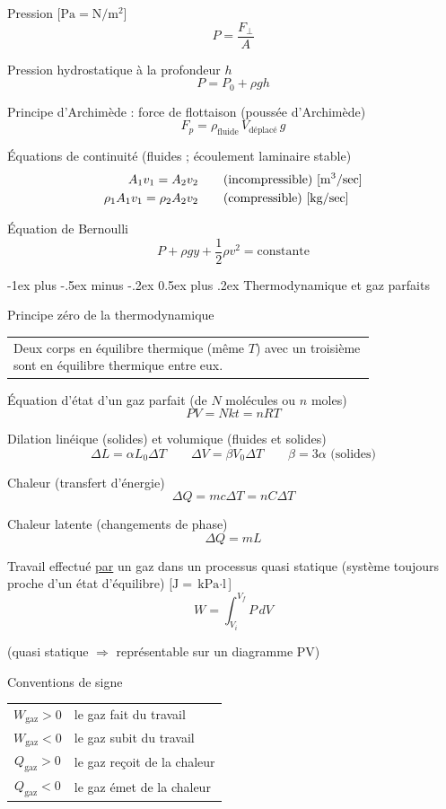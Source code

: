 \documentclass[10pt,landscape]{article}
\makeatletter
\renewcommand{\section}{\@startsection{section}{1}{0mm}%
                                {-1ex plus -.5ex minus -.2ex}%
                                {0.5ex plus .2ex}%
                                {\normalfont\large\bfseries}}
\newcommand{\halfline}{\vspace{0.5em}}
\newcommand{\tableindent}{\hspace{1.5em}}
\makeatother
\begin{document}
\begin{multicols}{3}
Pression [$\si{\pascal} = \si{\newton/\metre^2}$]
\[ P = \frac{F_\perp}{A} \]

Pression hydrostatique à la profondeur $h$
\[ P = P_0 + \rho gh \]

Principe d'Archimède : force de flottaison (poussée d'Archimède)
\[ F_p = \rho_\text{fluide} \, V_\text{déplacé} \, g \]

Équations de continuité (fluides ; écoulement laminaire stable)
\begin{align*}
	A_1 v_1 = A_2 v_2 \qquad &\text{(incompressible) [\si{\meter^3/\sec]}} \\
	\rho_1 A_1 v_1 = \rho_2 A_2 v_2 \qquad &\text{(compressible) [\si{\kilogram/\sec}]}
\end{align*}

Équation de Bernoulli
\[ P + \rho g y + \frac{1}{2}\rho v^2 = \text{constante} \]

\hrulefill


\section{Thermodynamique et gaz parfaits}

Principe zéro de la thermodynamique \\
\halfline
\begin{tabular}{@{\tableindent}p{0.8\linewidth}}
	Deux corps en équilibre thermique (même $T$) avec un troisième sont en équilibre thermique entre eux. \\
\end{tabular}
\halfline
	
Équation d'état d'un gaz parfait (de $N$ molécules ou $n$ moles)
\[ PV = Nkt = nRT \]

Dilation linéique (solides) et volumique (fluides et solides)
\[ \Delta L = \alpha L_0 \Delta T 
\qquad 
\Delta V = \beta V_0 \Delta T  \qquad  \beta = 3\alpha \text{ (solides)}
\]

Chaleur (transfert d'énergie)
\[ \Delta Q = mc\Delta T = nC\Delta T \]

Chaleur latente (changements de phase)
\[ \Delta Q = mL \]

Travail effectué \underline{par} un gaz dans un processus quasi statique (système toujours proche d'un état d'équilibre) [$\si{\joule} = \si{\kilo\pascal\cdot\litre}$]
\[ W = \int_{V_i}^{V_f} P\, dV \]

\tableindent (quasi statique $\Longrightarrow$ représentable sur un diagramme PV)
\halfline

Conventions de signe \\
\begin{tabular}{@{\tableindent}cl}
	$W_\text{gaz} > 0$ & le gaz fait du travail \\
	$W_\text{gaz} < 0$ & le gaz subit du travail \\
	$Q_\text{gaz} > 0$ & le gaz reçoit de la chaleur \\
	$Q_\text{gaz} < 0$ & le gaz émet de la chaleur \\
\end{tabular}
\halfline


\end{multicols}
\end{document}

